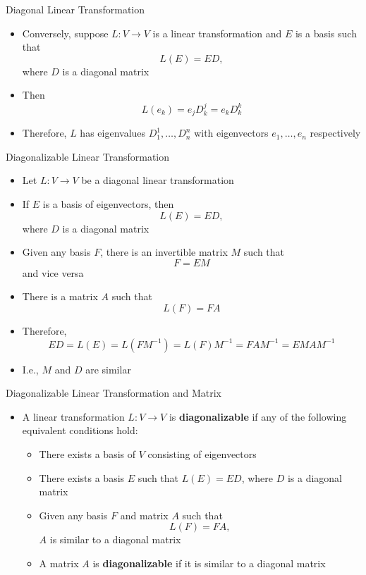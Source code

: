 \documentclass[usenames,dvipsnames,10pt]{beamer}
\begin{document}
\begin{frame}
  {Diagonal Linear Transformation}

  \begin{itemize}
  \item Conversely, suppose $L: V \rightarrow V$ is a linear transformation and $E$ is a basis such that
    \[
      L(E) = ED,
    \]
    where $D$ is a diagonal matrix
  \item Then
    \[ L(e_k) = e_jD^j_k = e_kD^k_k \]
  \item Therefore, $L$ has eigenvalues $D^1_1, \dots, D^n_n$ with eigenvectors $e_1, \dots, e_n$ respectively
  \end{itemize}
\end{frame}

\begin{frame}
  {Diagonalizable Linear Transformation}

  \begin{itemize}
  \item Let $L: V \rightarrow V$ be a diagonal linear transformation
  \item If $E$ is a basis of eigenvectors, then
    \[ L(E) = ED, \]
    where $D$ is a diagonal matrix
  \item Given any basis $F$, there is an invertible matrix $M$ such that
    \[ F = EM \]
    and vice versa
  \item There is a matrix $A$ such that
    \[ L(F) = FA \]
  \item Therefore,
    \[ ED = L(E) = L(FM^{-1}) = L(F)M^{-1} = FAM^{-1} = EMAM^{-1} \]
  \item I.e., $M$ and $D$ are similar
  \end{itemize}
\end{frame}

\begin{frame}
  {Diagonalizable Linear Transformation and Matrix}
  \begin{itemize}
  \item A linear transformation $L: V \rightarrow V$ is {\bf diagonalizable} if any of the following equivalent conditions hold:
    \begin{itemize}
    \item There exists a basis of $V$ consisting of eigenvectors
    \item There exists a basis $E$ such that $L(E) = ED$, where $D$ is a diagonal matrix
    \item Given any basis $F$ and matrix $A$ such that
      \[ L(F) = FA, \]
      $A$ is similar to a diagonal matrix
    \item A matrix $A$ is {\bf diagonalizable} if it is similar to a diagonal matrix
    \end{itemize}
  \end{itemize}
\end{frame}
\end{document}
